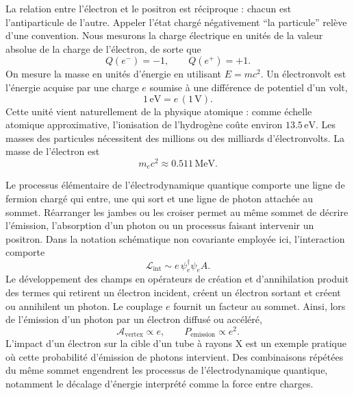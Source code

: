 La relation entre l’électron et le positron est réciproque : chacun est l’antiparticule de l’autre. Appeler l’état chargé négativement ``la particule'' relève d’une convention. Nous mesurons la charge électrique en unités de la valeur absolue de la charge de l’électron, de sorte que
\begin{equation}
Q(e^-)=-1,\qquad Q(e^+)=+1.
\end{equation}
On mesure la masse en unités d’énergie en utilisant \(E=mc^2\). Un électronvolt est l’énergie acquise par une charge \(e\) soumise à une différence de potentiel d’un volt,
\begin{equation}
1\,\mathrm{eV}=e\,(1\,\mathrm V).
\end{equation}
Cette unité vient naturellement de la physique atomique : comme échelle atomique approximative, l’ionisation de l’hydrogène coûte environ \(13.5\,\mathrm{eV}\). Les masses des particules nécessitent des millions ou des milliards d’électronvolts. La masse de l’électron est
\begin{equation}
m_e c^2 \approx 0.511\,\mathrm{MeV}.
\end{equation}

\begin{classroomqa}
\end{classroomqa}

Le processus élémentaire de l’électrodynamique quantique comporte une ligne de fermion chargé qui entre, une qui sort et une ligne de photon attachée au sommet. Réarranger les jambes ou les croiser permet au même sommet de décrire l’émission, l’absorption d’un photon ou un processus faisant intervenir un positron. Dans la notation schématique non covariante employée ici, l’interaction comporte
\begin{equation}
\mathcal{L}_{\mathrm{int}}\sim e\,\psi_e^\dagger \psi_e A.
\end{equation}
Le développement des champs en opérateurs de création et d’annihilation produit des termes qui retirent un électron incident, créent un électron sortant et créent ou annihilent un photon. Le couplage \(e\) fournit un facteur au sommet. Ainsi, lors de l’émission d’un photon par un électron diffusé ou accéléré,
\begin{equation}
\mathcal{A}_{\mathrm{vertex}}\propto e,
\qquad
P_{\mathrm{emission}}\propto e^2.
\end{equation}
L’impact d’un électron sur la cible d’un tube à rayons X est un exemple pratique où cette probabilité d’émission de photons intervient. Des combinaisons répétées du même sommet engendrent les processus de l’électrodynamique quantique, notamment le décalage d’énergie interprété comme la force entre charges.

